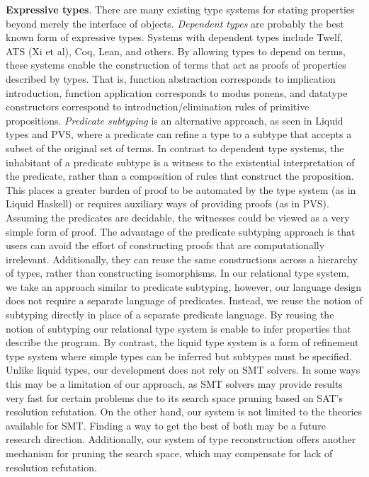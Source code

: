 \documentclass[sigplan]{acmart}
\theoremstyle{definition}
\begin{document}
\noindent
\textbf{Expressive types}. There are many existing type systems for stating properties beyond 
merely the interface of objects. \textit{Dependent types} are probably the best known form of expressive types. 
Systems with dependent types include Twelf\cite[?]{}, ATS (Xi et al), Coq, Lean, and others. By allowing types to depend on terms, 
these systems enable the construction of terms that act as proofs of properties described by types. 
That is, function abstraction corresponds to implication introduction, function application corresponds to modus ponens, and 
datatype constructors correspond to introduction/elimination rules of primitive propositions.
\textit{Predicate subtyping} is an alternative approach, as seen in Liquid types and PVS, 
where a predicate can refine a type to a subtype that accepts a subset of the original set of terms.
In contrast to dependent type systems, 
the inhabitant of a predicate subtype is a witness to the existential interpretation of the predicate, 
rather than a composition of rules that construct the proposition. 
This places a greater burden of proof to be automated by the type system (as in Liquid Haskell) or requires auxiliary ways of providing proofs (as in PVS).
Assuming the predicates are decidable, the witnesses could be viewed as a very simple form of proof.
The advantage of the predicate subtyping approach is that users can avoid the effort of constructing proofs that are computationally irrelevant.
Additionally, they can reuse the same constructions across a hierarchy of types, rather than constructing isomorphisms. 
In our relational type system, we take an approach similar to predicate subtyping, however, our language design does not require
a separate language of predicates. Instead, we reuse the notion of subtyping directly in place of a separate predicate language.
By reusing the notion of subtyping our relational type system is enable to infer
properties that describe the program. By contrast, the liquid type system 
is a form of refinement type system where simple types can be inferred but
subtypes must be specified.
Unlike liquid types, our development does not rely on SMT solvers. In some ways this may be a limitation of our approach, 
as SMT solvers may provide results very fast for certain problems due to its search space pruning based on SAT's resolution refutation. 
On the other hand, our system is not limited to the theories available for SMT. Finding a way to get the best of both may be 
a future research direction. Additionally, our system of type reconstruction offers another mechanism for pruning the search  
space, which may compensate for lack of resolution refutation.
\newline
\end{document}
